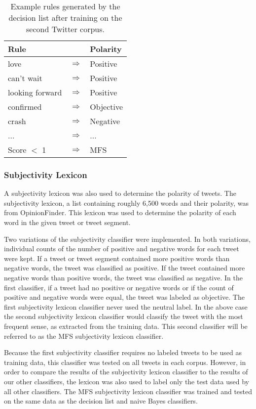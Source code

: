 \documentclass[11pt]{article}
\begin{document}
\begin{table}[H]
  \begin{center}
  \begin{tabular}{| p{3cm} l l |}
  \hline
  Rule & & Polarity \\ \hline
  love & $\Rightarrow$ & Positive \\
  can't wait & $\Rightarrow$ & Positive \\
  looking forward & $\Rightarrow$ & Positive \\
  confirmed & $\Rightarrow$ & Objective \\
  crash & $\Rightarrow$ & Negative \\
  ... & $\Rightarrow$ & ... \\
  Score $<$ 1 & $\Rightarrow$ & MFS \\ \hline
  \end{tabular}
  \end{center}
  \caption{Example rules generated by the decision list after training on the second Twitter corpus.}
\end{table}

\subsubsection*{Subjectivity Lexicon}
A subjectivity lexicon was also used to determine the polarity of tweets. The subjectivity lexicon, a list containing roughly 6,500 words and their polarity, was from OpinionFinder. This lexicon was used to determine the polarity of each word in the given tweet or tweet segment.

\indent Two variations of the subjectivity classifier were implemented. In both variations, individual counts of the number of positive and negative words for each tweet were kept. If a tweet or tweet segment contained more positive words than negative words, the tweet was classified as positive. If the tweet contained more negative words than positive words, the tweet was classified as negative. In the first classifier, if a tweet had no positive or negative words or if the count of positive and negative words were equal, the tweet was labeled as objective. The first subjectivity lexicon classifier never used the neutral label. In the above case the second subjectivity lexicon classifier would classify the tweet with the most frequent sense, as extracted from the training data. This second classifier will be referred to as the MFS subjectivity lexicon classifier.

\indent Because the first subjectivity classifier requires no labeled tweets to be used as training data, this classifier was tested on all tweets in each corpus. However, in order to compare the results of the subjectivity lexicon classifier to the results of our other classifiers, the lexicon was also used to label only the test data used by all other classifiers. The MFS subjectivity lexicon classifier was trained and tested on the same data as the decision list and naive Bayes classifiers. 
\end{document}
